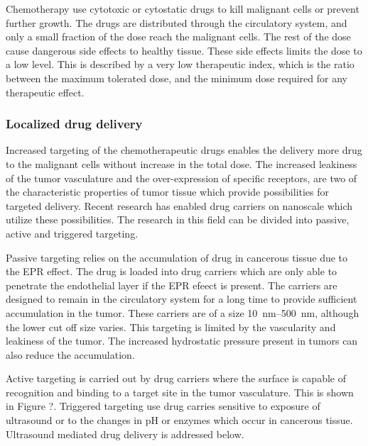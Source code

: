 Chemotherapy use cytotoxic or cytostatic drugs to kill malignant cells or prevent further growth. The drugs are distributed through the circulatory system, and only a small fraction of the dose reach the malignant cells. The rest of the dose cause dangerous side effects to healthy tissue\cite{doi:10.1056/NEJM200106283442607}. These side effects limits the dose to a low level. This is described by a very low therapeutic index, which is the ratio between the maximum tolerated dose, and the minimum dose required for any therapeutic effect. 
 
\subsubsection{Localized drug delivery}
Increased targeting of the chemotherapeutic drugs enables the delivery more drug to the malignant cells without increase in the total dose.  The increased leakiness of the tumor vasculature and the over-expression of specific receptors, are two of the characteristic properties of tumor tissue which provide possibilities for targeted delivery. Recent research has enabled drug carriers on nanoscale which utilize these possibilities\cite{Jafari}. The research in this field can be divided into passive, active and triggered targeting. 


Passive targeting relies on the accumulation of drug in cancerous tissue due to the EPR effect. The drug is loaded into drug carriers which are only able to penetrate the endothelial layer if the EPR efeect is present\cite{Andresen2010}. The carriers are designed to remain in the circulatory system for a long time to provide sufficient accumulation in the tumor. These carriers are of a size \SIrange{10}{500}{\nano\meter}, although the lower cut off size varies\cite{Hofmann}. This targeting is limited by the vascularity and leakiness of the tumor. The increased hydrostatic pressure present in tumors can also reduce the accumulation\cite{Bae2009}.  

Active targeting is carried out by drug carriers where the surface is capable of recognition and binding to a target site in the tumor vasculature. This is shown in Figure ?. Triggered targeting use drug carries sensitive to exposure of ultrasound or to the changes in pH or enzymes which occur in cancerous tissue. Ultrasound mediated drug delivery is addressed below.

